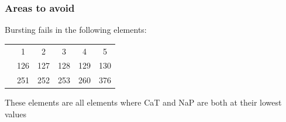 \documentclass{beamer}
\theoremstyle{plain}
\theoremstyle{definition}
\begin{document}
\begin{frame}\frametitle{Areas to avoid}
  Bursting fails in the following elements:
  \vspace{1em}



         \begin{tabular}{c c c c c c}

          & 1 & 2 & 3 & 4 & 5 \\

          & 126 & 127 & 128 & 129 & 130 \\

          & 251 & 252 & 253 & 260 & 376  \\
         \end{tabular}

  \vspace{1em}
  These elements are all elements where CaT and NaP are both at their lowest values
\end{frame}
\end{document}
